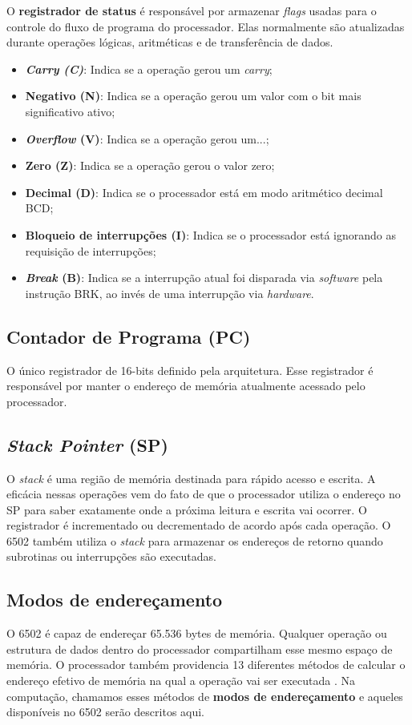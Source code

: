 \documentclass[
	12pt,				  %
	openright,		%
	a4paper,			%
	english,			%
	french,				%
	spanish,			%
	brazil,				%
]{abntex2}
\begin{document}
O \textbf{registrador de status} é responsável por armazenar \emph{flags} usadas
para o controle do fluxo de programa do processador. Elas normalmente são
atualizadas durante operações lógicas, aritméticas e de transferência de dados.
\begin{itemize}
	\item \textbf{\emph{Carry (C)}}: Indica se a operação gerou um \emph{carry};
	\item \textbf{Negativo (N)}: Indica se a operação gerou um valor com o bit
	      mais significativo ativo;
	\item \textbf{\emph{Overflow} (V)}: Indica se a operação gerou um...;
	\item \textbf{Zero (Z)}: Indica se a operação gerou o valor zero;
	\item \textbf{Decimal (D)}: Indica se o processador está em modo aritmético
	      decimal BCD;
	\item \textbf{Bloqueio de interrupções (I)}: Indica se o processador está
	      ignorando as requisição de interrupções;
	\item \textbf{\emph{Break} (B)}: Indica se a interrupção atual foi disparada
	      via \emph{software} pela instrução BRK, ao invés de uma interrupção via
	      \emph{hardware}.
\end{itemize}

\subsection{Contador de Programa (PC)}
O único registrador de 16-bits definido pela arquitetura. Esse registrador é
responsável por manter o endereço de memória atualmente acessado pelo
processador.

\subsection{\emph{Stack Pointer} (SP)}
O \emph{stack} é uma região de memória destinada para rápido acesso e escrita.
A eficácia nessas operações vem do fato de que o processador utiliza o endereço
no SP para saber exatamente onde a próxima leitura e escrita vai ocorrer.
O registrador é incrementado ou decrementado de acordo após cada operação. O
6502 também utiliza o \emph{stack} para armazenar os endereços de retorno quando
subrotinas ou interrupções são executadas.

\subsection{Modos de endereçamento}
O 6502 é capaz de endereçar 65.536 bytes de memória. Qualquer operação ou
estrutura de dados dentro do processador compartilham esse mesmo espaço de
memória. O processador também providencia 13 diferentes métodos de calcular o
endereço efetivo de memória na qual a operação vai ser executada
\cite{w65c02sDatasheet}. Na computação, chamamos esses métodos de
\textbf{modos de endereçamento} e aqueles disponíveis no 6502 serão descritos
aqui.
\end{document}
